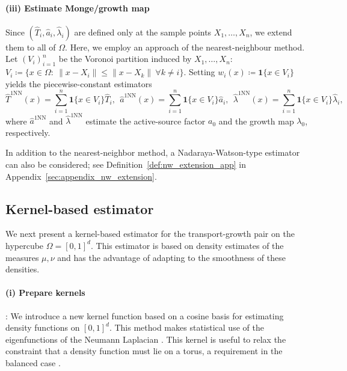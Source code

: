 \documentclass[11pt,reqno]{amsart}
\theoremstyle{definition}
\renewcommand{\hat}{\widehat}
\begin{document}
\paragraph{(iii) Estimate Monge/growth map}

Since $(\hat T_i,\hat a_i,\hat\lambda_i)$ are defined only at the sample points $X_1,\dots,X_n$, we extend them to all of $\Omega$.
Here, we employ an approach of the nearest-neighbour method. Let $(V_i)_{i=1}^n$ be the Voronoi partition induced by $X_1,\dots,X_n$:
    $V_i \coloneqq \{x\in\Omega:\ \|x-X_i\|\le \|x-X_k\|\ \forall k\neq i\}$.
Setting $w_i(x) \coloneqq \mathbf{1}\{x\in V_i\}$ yields the piecewise-constant estimators
\begin{equation}
\label{eq:disc-1nn-map}
    \hat T^{\mathrm{1NN}}(x)
    =
    \sum_{i=1}^n \mathbf{1}\{x\in V_i\} \hat T_i,
    ~~
    \hat a^{\mathrm{1NN}}(x)
    =
    \sum_{i=1}^n \mathbf{1}\{x\in V_i\}\hat a_i,
    ~~
    \hat\lambda^{\mathrm{1NN}}(x)
    =
    \sum_{i=1}^n \mathbf{1}\{x\in V_i\}\hat\lambda_i,
\end{equation}
where $\hat a^{\mathrm{1NN}}$ and $\hat\lambda^{\mathrm{1NN}}$ estimate the active-source factor $a_0$ and the growth map $\lambda_0$, respectively.

In addition to the nearest-neighbor method, a Nadaraya-Watson-type estimator  can also be considered; see Definition~\ref{def:nw_extension_app} in Appendix~\ref{sec:appendix_nw_extension}.




\subsection{Kernel-based estimator} \label{sec:kernel}

We next present a kernel-based estimator for the transport-growth pair on the hypercube $\Omega=[0,1]^d$.
This estimator is based on density estimates of the measures $\mu,\nu$ and has the advantage of adapting to the smoothness of these densities.



\paragraph{(i) Prepare kernels}:
We introduce a new kernel function based on a cosine basis for estimating density functions on $[0,1]^d$. This method makes statistical use \cite{efromovich2010orthogonal,tsybakov2009nonparametric} of the eigenfunctions of the Neumann Laplacian \cite{strang1999dct}. This kernel is useful to relax the constraint that a density function must lie on a torus, a requirement in the balanced case \cite{manole2024plugin}.
\end{document}
